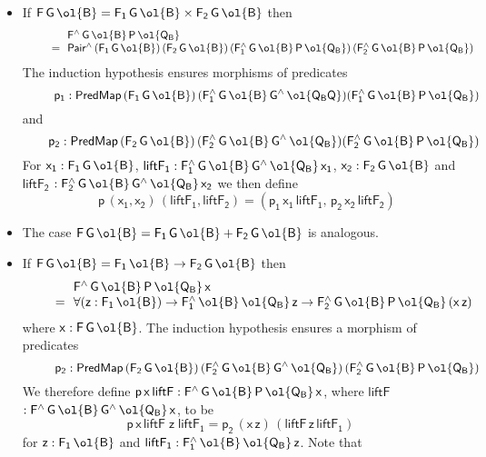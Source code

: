 \documentclass[sigplan,10pt,anonymous,review]{acmart}
\begin{document}
\begin{itemize}
\item 
If $\mathsf{F\,G\,\ol{B} = F_1\,G\,\ol{B} \times F_2\,G\,\ol{B}}$ then
\[\begin{array}{ll}
& \!\!\mathsf{F^{\wedge}\,G\,\ol{B}\,P\,\ol{Q_B}}\\
\quad\quad= & \!\!\mathsf{Pair^{\wedge}\,(F_1\,G\,\ol{B})\, (F_2\,G\,\ol{B})\,
  (F_1^{\wedge}\,G\,\ol{B}\,P\,\ol{Q_B})\,
  (F_2^{\wedge}\,G\,\ol{B}\,P\,\ol{Q_B})}
  \end{array}\] The induction hypothesis
  ensures
  morphisms of predicates
  \[\quad\quad\;\;\mathsf{p_1
  : PredMap\,(F_1\,G\,\ol{B})\,(F_1^{\wedge}\,G\,\ol{B}\,G^{\wedge}\,\ol{Q_BQ})
  (F_1^{\wedge}\,G\,\ol{B}\,P\,\ol{Q_B})}\] and \[\quad\quad\mathsf{p_2 :
  PredMap\,(F_2\,G\,\ol{B})\,(F_2^{\wedge}\,G\,\ol{B}\,G^{\wedge}\,\ol{Q_B})
  (F_2^{\wedge}\,G\,\ol{B}\,P\,\ol{Q_B})}\] For $\mathsf{x_1 :
  F_1\,G\,\ol{B}}$, $\mathsf{liftF_1 :
  F_1^{\wedge}\,G\,\ol{B}\,G^{\wedge}\,\ol{Q_B}\,x_1}$, $\mathsf{x_2 :
  F_2\,G\,\ol{B}}$ and $\mathsf{liftF_2}$ $\mathsf{:
  F_2^{\wedge}\,G\,\ol{B}\,G^{\wedge}\,\ol{Q_B}\,x_2}$ we then define
\[\quad\mathsf{p\, (x_1, x_2)\, (liftF_1, liftF_2) =
  (p_1\,x_1\,liftF_1,\, p_2\,x_2\,liftF_2)}\]
\item The case $\mathsf{F\,G\,\ol{B} = F_1\,G\,\ol{B} +
  F_2\,G\,\ol{B}}$ is analogous.
\item If $\mathsf{F\,G\,\ol{B} = F_1\,\ol{B} \to F_2\,G\,\ol{B}}$ then
  \[\begin{array}{ll}
  & \!\!\mathsf{F^{\wedge}\,G\,\ol{B}\,P\,\ol{Q_B}\,x}\\
  \quad\quad= & \!\!\mathsf{\forall (z :
  F_1\,\ol{B}) \to F_1^{\wedge}\,\ol{B}\,\ol{Q_B}\,z \to
  F_2^{\wedge}\,G\,\ol{B}\,P\,\ol{Q_B}\,(x\,z)}
  \end{array}\] where $\mathsf{x :
  F\,G\,\ol{B}}$. The induction hypothesis ensures
  a morphism of predicates
  \[\quad\quad\;\;\mathsf{p_2 : PredMap\,(F_2\,G\,\ol{B})\,
  (F_2^{\wedge}\,G\,\ol{B}\,G^{\wedge}\,\ol{Q_B})\,
  (F_2^{\wedge}\,G\,\ol{B}\,P\,\ol{Q_B})}\]  We therefore define
$\mathsf{p\,x\,liftF : F^{\wedge}\,G\,\ol{B}\,P\,\ol{Q_B}\,x}$, where
$\mathsf{liftF}$ $\mathsf{: F^{\wedge}\,G\,\ol{B}\,G^{\wedge}\,\ol{Q_B}\,x}$, to
be \[\mathsf{p\,x\,liftF\;z\;liftF_1 = p_2\, (x\,z)\,
  (liftF\,z\,liftF_1)}\] for $\mathsf{z : F_1\,\ol{B}}$ and
$\mathsf{liftF_1 : F_1^{\wedge}\,\ol{B}\,\ol{Q_B}\,z}$. Note that

\end{itemize}
\end{document}
